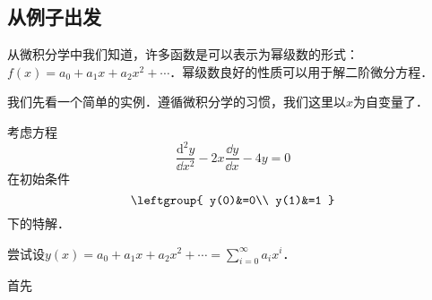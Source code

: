 

\subsection{从例子出发}

从微积分学中我们知道，许多函数是可以表示为幂级数的形式：$f(x)=a_0+a_1x+a_2x^2+\cdots$．幂级数良好的性质可以用于解二阶微分方程．

我们先看一个简单的实例．遵循微积分学的习惯，我们这里以$x$为自变量了．

\begin{example}{}
考虑方程
\begin{equation}
\frac{\mathrm{d}^2 y}{\dd x^2}-2x\frac{\dd y}{\dd x}-4y=0
\end{equation}
在初始条件
\begin{equation}
\leftgroup{
    y(0)&=0\\
    y(1)&=1
}
\end{equation}
下的特解．

尝试设$y(x)=a_0+a_1x+a_2x^2+\cdots=\sum\limits_{i=0}^\infty a_ix^i$．

首先


\end{example}








